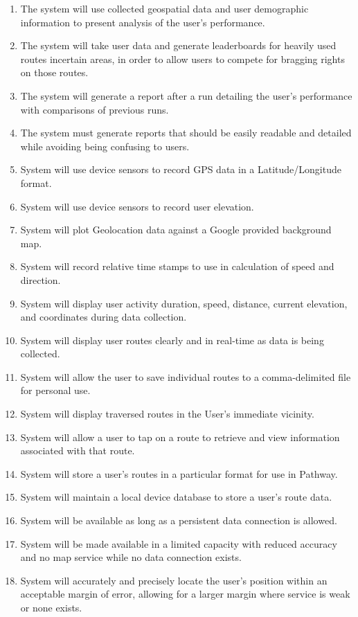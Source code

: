 ﻿\documentclass{article}
\begin{document}
\begin{enumerate}
    \item The system will use collected geospatial data and user demographic information to present analysis of the user’s performance.
    \item The system will take user data and generate leaderboards for heavily used routes incertain areas, in order to allow users to compete for bragging rights on those routes.
    \item The system will generate a report after a run detailing the user’s performance with comparisons of previous runs.
    \item The system must generate reports that should be easily readable and detailed while avoiding being confusing to users.
    \item System will use device sensors to record GPS data in a Latitude/Longitude format.
    \item System will use device sensors to record user elevation.
    \item System will plot Geolocation data against a Google provided background map.
    \item System will record relative time stamps to use in calculation of speed and direction.
    \item System will display user activity duration, speed, distance, current elevation, and coordinates during data collection.
    \item System will display user routes clearly and in real-time as data is being collected.
    \item System will allow the user to save individual routes to a comma-delimited file for personal use.
    \item System will display traversed routes in the User's immediate vicinity.
    \item System will allow a user to tap on a route to retrieve and view information associated with that route.
    \item System will store a user’s routes in a particular format for use in Pathway.
    \item System will maintain a local device database to store a user's route data.
    \item System will be available as long as a persistent data connection is allowed.
    \item System will be made available in a limited capacity with reduced accuracy and no map service while no data connection exists.
    \item System will accurately and precisely locate the user’s position within an acceptable margin of error, allowing for a larger margin where service is weak or none exists.

\end{enumerate}
\end{document}
